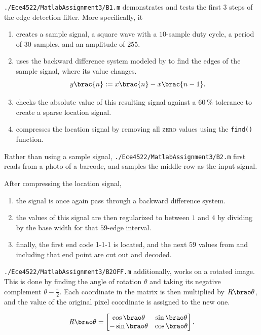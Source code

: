 \documentclass[conference]{../lib/IEEEtran}
\DeclarePairedDelimiter\brao()%
\DeclarePairedDelimiter\brac[]%
\newcommand*\tbrao[1]{(#1)}
\begin{document}
\texttt{./Ece4522/MatlabAssignment3/B1.m} demonstrates and tests the first \(3\) steps of the edge detection filter. More specifically, it
\begin{enumerate}
    \item
        creates a sample signal, a square wave with a \(10\)-sample duty cycle, a period of \(30\) samples, and an amplitude of \(255\).
    \item
        uses the backward difference system modeled by \tbrao{\ref{eqn:bdn}} to find the edges of the sample signal, where its value changes.
        \begin{eqnarray}\label{eqn:bdn}
            y\brac{n} := x\brac{n} - x\brac{n - 1}.
        \end{eqnarray}
    \item
        checks the absolute value of this resulting signal against a \(\SI{60}\percent\) tolerance to create a sparse location signal.
    \item
        compresses the location signal by removing all \textsc{zero} values using the \texttt{find()} function.
\end{enumerate}

Rather than using a sample signal, \texttt{./Ece4522/MatlabAssignment3/B2.m} first reads from a photo of a barcode, and samples the middle row as the input signal.

After compressing the location signal,
\begin{enumerate}
    \item
        the signal is once again pass through a backward difference system.
    \item
        the values of this signal are then regularized to between \(1\) and \(4\) by dividing by the base width for that \(59\)-edge interval.
    \item
        finally, the first end code 1-1-1 is located, and the next \(59\) values from and including that end point are cut out and decoded.
\end{enumerate}

\texttt{./Ece4522/MatlabAssignment3/B2OFF.m} additionally, works on a rotated image. This is done by finding the angle of rotation \(\theta\) and taking its negative complement \(\theta - \frac\pi2\). Each coordinate in the matrix is then multiplied by \(R\brao\theta\), and the value of the original pixel coordinate is assigned to the new one. 

\[
    R\brao\theta = \begin{bmatrix} \cos\brao\theta & \sin\brao\theta \\* -\sin\brao\theta & \cos\brao\theta \end{bmatrix}.
\]
\end{document}
